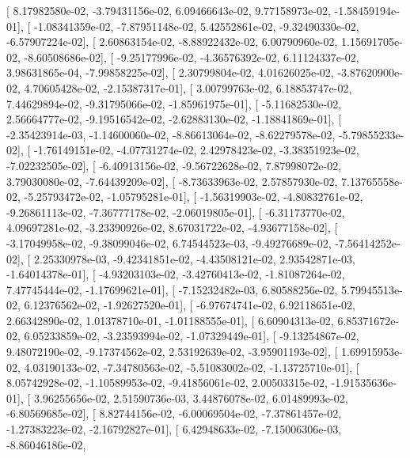 \documentclass{article}
\begin{document}
       [  8.17982580e-02,  -3.79431156e-02,   6.09466643e-02,
          9.77158973e-02,  -1.58459194e-01],
       [ -1.08341359e-02,  -7.87951148e-02,   5.42552861e-02,
         -9.32490330e-02,  -6.57907224e-02],
       [  2.60863154e-02,  -8.88922432e-02,   6.00790960e-02,
          1.15691705e-02,  -8.60508686e-02],
       [ -9.25177996e-02,  -4.36576392e-02,   6.11124337e-02,
          3.98631865e-04,  -7.99858225e-02],
       [  2.30799804e-02,   4.01626025e-02,  -3.87620900e-02,
          4.70605428e-02,  -2.15387317e-01],
       [  3.00799763e-02,   6.18853747e-02,   7.44629894e-02,
         -9.31795066e-02,  -1.85961975e-01],
       [ -5.11682530e-02,   2.56664777e-02,  -9.19516542e-02,
         -2.62883130e-02,  -1.18841869e-01],
       [ -2.35423914e-03,  -1.14600060e-02,  -8.86613064e-02,
         -8.62279578e-02,  -5.79855233e-02],
       [ -1.76149151e-02,  -4.07731274e-02,   2.42978423e-02,
         -3.38351923e-02,  -7.02232505e-02],
       [ -6.40913156e-02,  -9.56722628e-02,   7.87998072e-02,
          3.79030080e-02,  -7.64439209e-02],
       [ -8.73633963e-02,   2.57857930e-02,   7.13765558e-02,
         -5.25793472e-02,  -1.05795281e-01],
       [ -1.56319903e-02,  -4.80832761e-02,  -9.26861113e-02,
         -7.36777178e-02,  -2.06019805e-01],
       [ -6.31173770e-02,   4.09697281e-02,  -3.23390926e-02,
          8.67031722e-02,  -4.93677158e-02],
       [ -3.17049958e-02,  -9.38099046e-02,   6.74544523e-03,
         -9.49276689e-02,  -7.56414252e-02],
       [  2.25330978e-03,  -9.42341851e-02,  -4.43508121e-02,
          2.93542871e-03,  -1.64014378e-01],
       [ -4.93203103e-02,  -3.42760413e-02,  -1.81087264e-02,
          7.47745444e-02,  -1.17699621e-01],
       [ -7.15232482e-03,   6.80588256e-02,   5.79945513e-02,
          6.12376562e-02,  -1.92627520e-01],
       [ -6.97674741e-02,   6.92118651e-02,   2.66342890e-02,
          1.01378710e-01,  -1.01188555e-01],
       [  6.60904313e-02,   6.85371672e-02,   6.05233859e-02,
         -3.23593994e-02,  -1.07329449e-01],
       [ -9.13254867e-02,   9.48072190e-02,  -9.17374562e-02,
          2.53192639e-02,  -3.95901193e-02],
       [  1.69915953e-02,   4.03190133e-02,  -7.34780563e-02,
         -5.51083002e-02,  -1.13725710e-01],
       [  8.05742928e-02,  -1.10589953e-02,  -9.41856061e-02,
          2.00503315e-02,  -1.91535636e-01],
       [  3.96255656e-02,   2.51590736e-03,   3.44876078e-02,
          6.01489993e-02,  -6.80569685e-02],
       [  8.82744156e-02,  -6.00069504e-02,  -7.37861457e-02,
         -1.27383223e-02,  -2.16792827e-01],
       [  6.42948633e-02,  -7.15006306e-03,  -8.86046186e-02,
\end{document}
